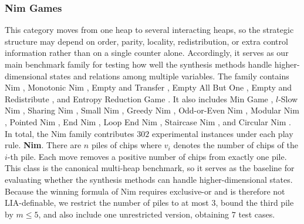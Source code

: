 \documentclass[review]{elsarticle}
\newcommand{\set}[1]{\{ #1 \}}
\newcommand{\tuple}[1]{\langle {#1} \rangle}
\newcommand{\true}{\top}
\newcommand{\statevar}{\mathcal{X}}
\newcommand{\act}{\mathcal{A}}
\newcommand{\constraint}{\mathcal{C}}
\newcommand{\estate}{\mathcal{E}}
\newcommand{\pre}{\mathtt{pre}}
\newcommand{\eff}{\mathtt{eff}}
\begin{document}
{\color{red}\subsubsection{Nim Games}}
{\color{red}This category moves from one heap to several interacting heaps, so the strategic structure may depend on order, parity, locality, redistribution, or extra control information rather than on a single counter alone.}
{\color{red}Accordingly, it serves as our main benchmark family for testing how well the synthesis methods handle higher-dimensional states and relations among multiple variables.}
{\color{red}The family contains Nim \cite{Bou1901}, Monotonic Nim \cite{AhnCCEFGGKMPS2017}, Empty and Transfer \cite{Fer1998}, Empty All But One \cite{Fer1998}, Empty and Redistribute \cite{Fer1998}, and Entropy Reduction Game \cite{Fer1998}.}
{\color{red}It also includes Min Game \cite{CaiH2010}, $l$-Slow Nim \cite{AhnCCEFGGKMPS2017}, Sharing Nim \cite{Ho2016}, Small Nim \cite{BerCG2001}, Greedy Nim \cite{AlbN2004}, Odd-or-Even Nim \cite{SmiS2002}, Modular Nim \cite{GavS2004}, Pointed Nim \cite{AlbN2004}, End Nim \cite{AlbN2001}, Loop End Nim \cite{AlbN2001}, Staircase Nim \cite{Spr1937}, and Circular Nim \cite{DufH2013}.}
{\color{red}In total, the Nim family contributes $302$ experimental instances under each play rule.}
{\color{red}\textbf{Nim}. There are $n$ piles of chips where $v_i$ denotes the number of chips of the $i$-th pile.}
{\color{red}Each move removes a positive number of chips from exactly one pile.}
{\color{red}This class is the canonical multi-heap benchmark, so it serves as the baseline for evaluating whether the synthesis methods can handle higher-dimensional states.}
{\color{red}Because the winning formula of Nim requires exclusive-or and is therefore not LIA-definable, we restrict the number of piles to at most $3$, bound the third pile by $m \le 5$, and also include one unrestricted version, obtaining $7$ test cases.}
\end{document}
